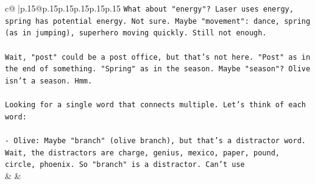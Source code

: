 \documentclass{article}
\begin{document}
{\begin{supertabular}{c@{$\;$}|p{.15\linewidth}@{}p{.15\linewidth}p{.15\linewidth}p{.15\linewidth}p{.15\linewidth}p{.15\linewidth}}
{{{\texttt{What about "energy"? Laser uses energy, spring has potential energy. Not sure. Maybe "movement": dance, spring (as in jumping), superhero moving quickly. Still not enough.} \\
\\ 
\texttt{Wait, "post" could be a post office, but that's not here. "Post" as in the end of something. "Spring" as in the season. Maybe "season"? Olive isn't a season. Hmm.} \\
\\ 
\texttt{Looking for a single word that connects multiple. Let's think of each word:} \\
\\ 
\texttt{{-} Olive: Maybe "branch" (olive branch), but that's a distractor word. Wait, the distractors are charge, genius, mexico, paper, pound, circle, phoenix. So "branch" is a distractor. Can't use} \\
            }
        }
    }
    & & \\ \\


\end{supertabular}}
\end{document}
